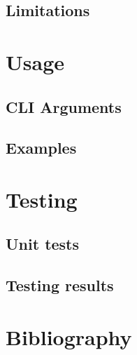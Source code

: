 \documentclass{report}
\begin{document}
\section{Limitations}


\chapter{Usage}

\section{CLI Arguments}

\section{Examples}

\chapter{Testing}

\section{Unit tests}

\section{Testing results}

\chapter{Bibliography}

\end{document}

